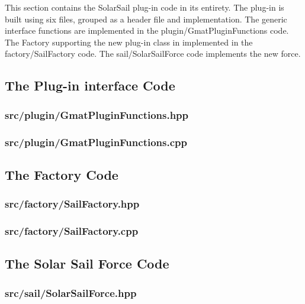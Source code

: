 \documentclass[letterpaper,10pt]{article}
\begin{document}
This section contains the SolarSail plug-in code in its entirety.  The plug-in is built using six
files, grouped as a header file and implementation.  The generic interface functions are
implemented in the plugin/GmatPluginFunctions code.  The Factory supporting the new plug-in class
in implemented in the factory/SailFactory code.  The sail/SolarSailForce code implements the new
force.

\subsection{\label{sec:InterfaceCode}The Plug-in interface Code}

\subsubsection{src/plugin/GmatPluginFunctions.hpp}



\subsubsection{src/plugin/GmatPluginFunctions.cpp}



\subsection{\label{sec:FactoryCode}The Factory Code}

\subsubsection{src/factory/SailFactory.hpp}



\subsubsection{src/factory/SailFactory.cpp}



\subsection{\label{sec:SailCode}The Solar Sail Force Code}

\subsubsection{src/sail/SolarSailForce.hpp}
\end{document}
